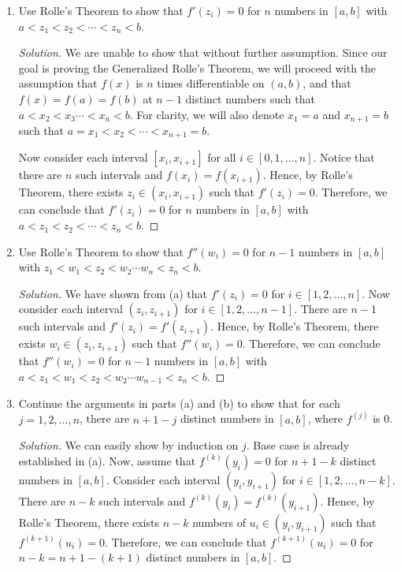 \documentclass{article}
\begin{document}
\begin{enumerate}[label=\alph*.]
    \item Use Rolle's Theorem to show that $f'(z_i) = 0$ for $n$ numbers in $[a,b]$ with 
    $a < z_1 < z_2 < \cdots < z_{n} < b$.

    \begin{proof}[Solution]
        We are unable to show that without further assumption. Since our goal is proving the 
        Generalized Rolle's Theorem, we will proceed with the assumption that $f(x)$ is $n$ times 
        differentiable on $(a, b)$, and that $f(x) = f(a) = f(b)$ at $n - 1$ distinct numbers such 
        that $a < x_2 < x_3 \cdots < x_n < b$. For clarity, we will also denote $x_1 = a$ and 
        $x_{n+1} = b$ such that $a = x_1 < x_2 < \cdots < x_{n+1} = b$.

        Now consider each interval $[x_i, x_{i+1}]$ for all $i\in [0, 1, \dots, n]$. Notice that 
        there are $n$ such intervals and $f(x_i) = f(x_{i+1})$. Hence, by 
        Rolle's Theorem, there exists $z_i \in (x_i, x_{i+1})$ such that $f'(z_i) = 0$. Therefore, 
        we can conclude that $f'(z_i) = 0$ for $n$ numbers in $[a,b]$ with $a < z_1 < z_2 < \cdots 
        < z_{n} < b$.
    \end{proof}
    
    \item Use Rolle's Theorem to show that $f''(w_i) = 0$ for $n-1$ numbers in $[a,b]$ with 
    $z_1 < w_1 < z_2 < w_2 \cdots w_{n} < z_{n} < b$.

    \begin{proof}[Solution]
        We have shown from (a) that $f'(z_i) = 0$ for $i \in [1, 2, \dots, n]$. Now consider each 
        interval $(z_i, z_{i+1})$ for $i \in [1, 2, \dots, n-1]$. There are $n-1$ such intervals and 
        $f'(z_i) = f'(z_{i+1})$. Hence, by Rolle's Theorem, there exists $w_i \in (z_i, z_{i+1})$ 
        such that $f''(w_i) = 0$. Therefore, we can conclude that $f''(w_i) = 0$ for $n-1$ numbers 
        in $[a,b]$ with $a < z_1 < w_1 < z_2 < w_2 \cdots w_{n-1} < z_{n} < b$.
    \end{proof}

    \item Continue the arguments in parts (a) and (b) to show that for each $j = 1, 2, \dots, n$, 
    there are $n+1-j$ distinct numbers in $[a,b]$, where $f^{(j)}$ is 0.

    \begin{proof}[Solution]
        We can easily show by induction on $j$. Base case is already established in (a). Now, assume that 
        $f^{(k)}(y_i) = 0$ for $n+1-k$ distinct numbers in $[a,b]$. Consider each interval $(y_i, 
        y_{i+1})$ for $i\in [1, 2, \dots, n-k]$. There are $n-k$ such intervals and $f^{(k)}(y_i) =
        f^{(k)}(y_{i+1})$. Hence, by Rolle's Theorem, there exists $n-k$ numbers of $u_i \in (y_i, y_{i+1})$ such 
        that $f^{(k+1)}(u_i) = 0$. Therefore, we can conclude that $f^{(k+1)}(u_i) = 0$ for $n-k = 
        n + 1 - (k+1)$ distinct numbers in $[a,b]$. 


\end{proof}
\end{enumerate}
\end{document}
